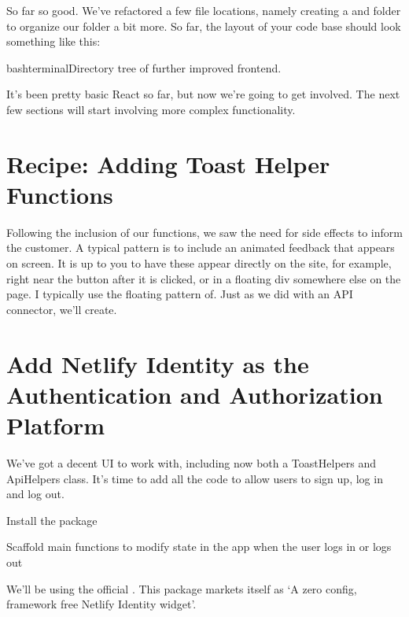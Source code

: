 \documentclass[paper=6in:9in,pagesize=pdftex,headinclude=on,footinclude=on,12pt]{scrbook}
\begin{document}
So far so good. We've refactored a few file locations, namely creating a  and  folder to organize our  folder a bit more. So far, the layout of your code base should look something like this:

\begin{codeInput}{bash}{terminal}{Directory tree of further improved frontend.}

\end{codeInput}

It's been pretty basic React so far, but now we're going to get involved. The next few sections will start involving more complex functionality.

\section{Recipe: Adding Toast Helper Functions}

Following the inclusion of our  functions, we saw the need for side effects to inform the customer. A typical pattern is to include an animated feedback that appears on screen. It is up to you to have these appear directly on the site, for example, right near the button after it is clicked, or in a floating div somewhere else on the page. I typically use the floating pattern of. Just as we did with an API connector, we'll create.


\section{Add Netlify Identity as the Authentication and Authorization Platform}

We've got a decent UI to work with, including now both a ToastHelpers and ApiHelpers class. It's time to add all the code to allow users to sign up, log in and log out. 

\begin{arrows}
\item Install the  package
\item Scaffold main functions to modify state in the app when the user logs in or logs out
\end{arrows}


We'll be using the official . This package markets itself as `A zero config, framework free Netlify Identity widget'. 
\end{document}
